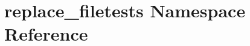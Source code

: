 \hypertarget{namespacereplace__filetests}{\section{replace\-\_\-filetests Namespace Reference}
\label{namespacereplace__filetests}
}
